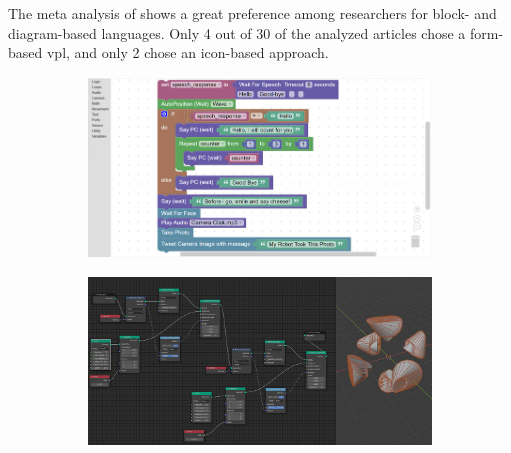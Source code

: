 The meta analysis of \cite{kuhail_characterizing_2021} shows a great preference among researchers for block- and diagram-based languages. 
Only 4 out of 30 of the analyzed articles chose a form-based vpl, and only 2 chose an icon-based approach.  

\begin{figure}
\centering
\begin{subfigure}[b]{0.45\linewidth}
  \graphicspath{{../../assets/images/background/vpl/}}
  \centering
  \includegraphics[width=\linewidth]{block-based.png}
  \caption{}\label{fig:vpl-types:1}
\end{subfigure}%
\qquad %
\begin{subfigure}[b]{0.45\linewidth}
  \graphicspath{{../../assets/images/background/vpl/}}
  \centering
  \includegraphics[width=\linewidth]{diagram-based.jpg}
  \caption{}\label{fig:vpl-types:2}
\end{subfigure}%
\\
\begin{subfigure}[c]{0.45\linewidth}
  \centering
  \graphicspath{{../../assets/images/background/vpl/}}

\end{subfigure}
\end{figure}
